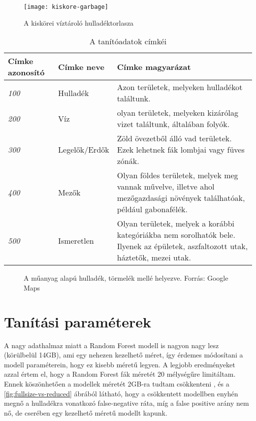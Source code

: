 \begin{figure}[H]
	\centering
	\texttt{[image: kiskore-garbage]}
	\caption{A kiskörei víztároló hulladéktorlasza \cite{petkupa2024}}
    \label{fig:kiskore-waste}
\end{figure}

\begin{table}[H]
	\centering
	\begin{tabular}{ | p{} | p{} | p{} | }
		\hline
		\textbf{Címke azonosító} & \textbf{Címke neve} & \textbf{Címke magyarázat} \\
		\hline \hline
		\emph{100} & Hulladék & Azon területek, melyeken hulladékot találtunk. \\
		\hline
		\emph{200} & Víz & olyan területek, melyeken kizárólag vizet találtunk, általában folyók. \\
		\hline
		\emph{300} & Legelők/Erdők & Zöld övezetből álló vad területek. Ezek lehetnek fák lombjai vagy füves zónák. \\
		\hline
        \emph{400} & Mezők & Olyan földes területek, melyek meg vannak művelve, illetve ahol mezőgazdasági növények találhatóak, például gabonafélék. \\
		\hline
        \emph{500} & Ismeretlen & Olyan területek, melyek a korábbi kategóriákba nem sorolhatók bele. Ilyenek az épületek, aszfaltozott utak, háztetők, mezei utak. \\
		\hline
	\end{tabular}
	\caption{A tanítóadatok címkéi}
	\label{tab:waste-detection-labels}
\end{table}

\begin{figure}[H]
	\centering
	\hspace{5pt}
	\caption{A műanyag alapú hulladék, törmelék mellé helyezve. Forrás: Google Maps}
	\label{fig:waste-vs-debris}
\end{figure}



\section{Tanítási paraméterek}
\label{ch:teaching-params}

A nagy adathalmaz miatt a Random Forest modell is nagyon nagy lesz (körülbelül 14GB), ami egy nehezen kezelhető méret, így érdemes módosítani a modell paraméterein, hogy ez kisebb méretű legyen. A legjobb eredményeket azzal értem el, hogy a Random Forest fák méretét 20 mélységűre limitáltam. Ennek köszönhetően a modellek méretét 2GB-ra tudtam csökkenteni , és a \ref{fig:fullsize-vs-reduced} ábrából látható, hogy a csökkentett modellben enyhén megnő a hulladékra vonatkozó false-negative ráta, míg a false positive arány nem nő, de cserében egy kezelhető méretű modellt kapunk.

